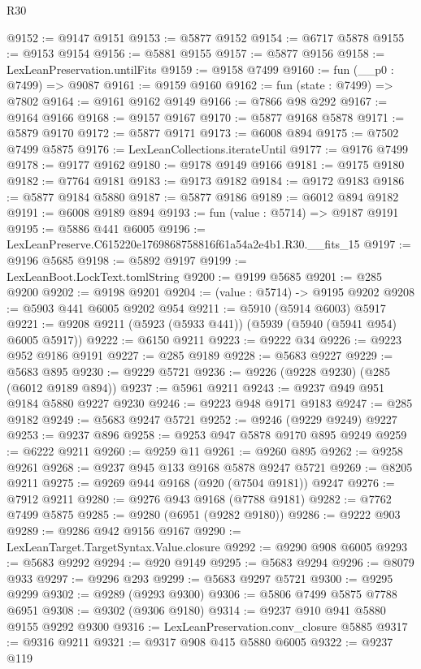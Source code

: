\begin{lexlean}{R30}
\begin{coremodule}
@9152 := @9147 @9151
@9153 := @5877 @9152
@9154 := @6717 @5878
@9155 := @9153 @9154
@9156 := @5881 @9155
@9157 := @5877 @9156
@9158 := LexLeanPreservation.untilFits
@9159 := @9158 @7499
@9160 := fun (__p0 : @7499) => @9087
@9161 := @9159 @9160
@9162 := fun (state : @7499) => @7802
@9164 := @9161 @9162 @9149
@9166 := @7866 @98 @292
@9167 := @9164 @9166
@9168 := @9157 @9167
@9170 := @5877 @9168 @5878
@9171 := @5879 @9170
@9172 := @5877 @9171
@9173 := @6008 @894
@9175 := @7502 @7499 @5875
@9176 := LexLeanCollections.iterateUntil
@9177 := @9176 @7499
@9178 := @9177 @9162
@9180 := @9178 @9149 @9166
@9181 := @9175 @9180
@9182 := @7764 @9181
@9183 := @9173 @9182
@9184 := @9172 @9183
@9186 := @5877 @9184 @5880
@9187 := @5877 @9186
@9189 := @6012 @894 @9182
@9191 := @6008 @9189 @894
@9193 := fun (value : @5714) => @9187 @9191
@9195 := @5886 @441 @6005
@9196 := LexLeanPreserve.C615220e1769868758816f61a54a2e4b1.R30.__fits_15
@9197 := @9196 @5685
@9198 := @5892 @9197
@9199 := LexLeanBoot.LockText.tomlString
@9200 := @9199 @5685
@9201 := @285 @9200
@9202 := @9198 @9201
@9204 := (value : @5714) -> @9195 @9202
@9208 := @5903 @441 @6005 @9202 @954
@9211 := @5910 (@5914 @6003) @5917
@9221 := @9208 @9211 (@5923 (@5933 @441)) (@5939 (@5940 (@5941 @954) @6005 @5917))
@9222 := @6150 @9211
@9223 := @9222 @34
@9226 := @9223 @952 @9186 @9191
@9227 := @285 @9189
@9228 := @5683 @9227
@9229 := @5683 @895
@9230 := @9229 @5721
@9236 := @9226 (@9228 @9230) (@285 (@6012 @9189 @894))
@9237 := @5961 @9211
@9243 := @9237 @949 @951 @9184 @5880 @9227 @9230
@9246 := @9223 @948 @9171 @9183
@9247 := @285 @9182
@9249 := @5683 @9247 @5721
@9252 := @9246 (@9229 @9249) @9227
@9253 := @9237 @896
@9258 := @9253 @947 @5878 @9170 @895 @9249
@9259 := @6222 @9211
@9260 := @9259 @11
@9261 := @9260 @895
@9262 := @9258 @9261
@9268 := @9237 @945 @133 @9168 @5878 @9247 @5721
@9269 := @8205 @9211
@9275 := @9269 @944 @9168 (@920 (@7504 @9181)) @9247
@9276 := @7912 @9211
@9280 := @9276 @943 @9168 (@7788 @9181)
@9282 := @7762 @7499 @5875
@9285 := @9280 (@6951 (@9282 @9180))
@9286 := @9222 @903
@9289 := @9286 @942 @9156 @9167
@9290 := LexLeanTarget.TargetSyntax.Value.closure
@9292 := @9290 @908 @6005
@9293 := @5683 @9292
@9294 := @920 @9149
@9295 := @5683 @9294
@9296 := @8079 @933
@9297 := @9296 @293
@9299 := @5683 @9297 @5721
@9300 := @9295 @9299
@9302 := @9289 (@9293 @9300)
@9306 := @5806 @7499 @5875 @7788 @6951
@9308 := @9302 (@9306 @9180)
@9314 := @9237 @910 @941 @5880 @9155 @9292 @9300
@9316 := LexLeanPreservation.conv_closure @5885
@9317 := @9316 @9211
@9321 := @9317 @908 @415 @5880 @6005
@9322 := @9237 @119

\end{coremodule}
\end{lexlean}
